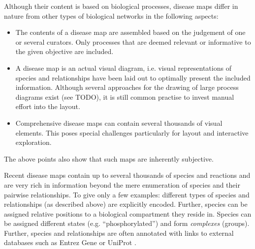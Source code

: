 \documentclass[
	fontsize=10pt, %
	twoside=false, %
	secnumdepth=1, %
]{kaobook}
\begin{document}
Although their content is based on biological processes, disease maps differ in
nature from other types of biological networks in the following aspects:
\begin{itemize}
\item The contents of a disease map are assembled based on the judgement of one
  or several curators. Only processes that are deemed relevant or informative to
  the given objective are included.
\item A disease map is an actual visual diagram, i.e. visual representations of
  species and relationships have been laid out to optimally present the included
  information. Although several approaches for the drawing of large process
  diagrams exist (see TODO), it is still common practise
  to invest manual effort into the layout.
\item Comprehensive disease maps can contain several thousands of visual
  elements. This poses special challenges particularly for layout and
  interactive exploration. 
\end{itemize}
The above points also show that such maps are inherently subjective.

Recent disease maps contain up to several thousands of species and reactions and
are very rich in information beyond the mere enumeration of species and their
pairwise relationships. To give only a few examples: different types of species
and relationships (as described above) are explicitly encoded. Further, species
can be assigned relative positions to a biological compartment they reside in.
Species can be assigned different states (e.g. ``phosphorylated'') and form
\textit{complexes} (groups). Further, species and relationships are often
annotated with links to external databases such as Entrez Gene
\cite{maglott_EntrezGeneGenecentered_2005} or UniProt
\cite{theuniprotconsortium_UniProtUniversalProtein_2021}.



\end{document}
